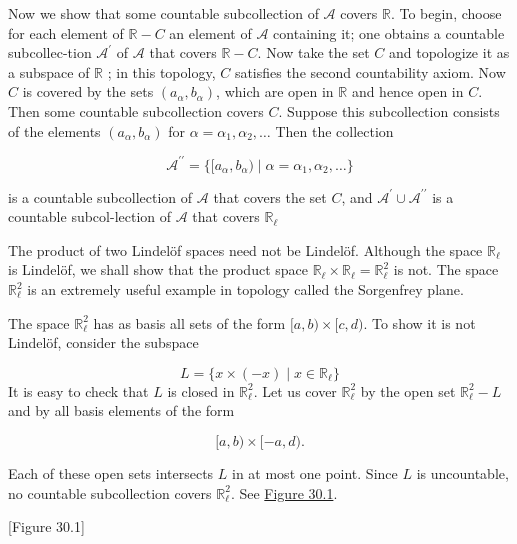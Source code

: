 \begin{centeredblock*}
\begin{example}
Now we show that some countable subcollection of \(\mathcal{A}\) covers \(\mathbb{R}\). To begin, choose for each element of \(\mathbb{R} - C\) an element of \(\mathcal{A}\) containing it; one obtains a countable subcollec-tion \(\mathcal{A}^{\prime }\) of \(\mathcal{A}\) that covers \(\mathbb{R} - C\). Now take the set \(C\) and topologize it as a subspace of \(\mathbb{R}\) ; in this topology, \(C\) satisfies the second countability axiom. Now \(C\) is covered by the sets \(( {a_{\alpha },b_{\alpha }})\), which are open in \(\mathbb{R}\) and hence open in \(C\). Then some countable subcollection covers \(C\). Suppose this subcollection consists of the elements \(( {a_{\alpha },b_{\alpha }})\) for \(\alpha = {\alpha }_{1},{\alpha }_{2},\ldots\) Then the collection

\[
\mathcal{A}^{\prime \prime } = \{ {[ {a_{\alpha },b_{\alpha }}) \mid \alpha = {\alpha }_{1},{\alpha }_{2},\ldots}\}
\]

is a countable subcollection of \(\mathcal{A}\) that covers the set \(C\), and \(\mathcal{A}^{\prime } \cup {\mathcal{A}}^{\prime \prime }\) is a countable subcol-lection of \(\mathcal{A}\) that covers \(\mathbb{R}_{\ell }\)
\end{example}
\end{centeredblock*}

\begin{centeredblock*}
\begin{example}
\label{ex:\thesection.\theexample}
 The product of two Lindelöf spaces need not be Lindelöf. Although the space \(\mathbb{R}_{\ell }\) is Lindelöf, we shall show that the product space \(\mathbb{R}_{\ell } \times {\mathbb{R}}_{\ell } = \mathbb{R}_{\ell }^{2}\) is not. The space \(\mathbb{R}_{\ell }^{2}\) is an extremely useful example in topology called the Sorgenfrey plane.

The space \(\mathbb{R}_{\ell }^{2}\) has as basis all sets of the form \(\lbrack a,b) \times \lbrack c,d)\). To show it is not Lindelöf, consider the subspace

\[
L = \{ {x \times ( {-x}) \mid x \in {\mathbb{R}}_{\ell }}\}
\]
It is easy to check that \(L\) is closed in \(\mathbb{R}_{\ell }^{2}\). Let us cover \(\mathbb{R}_{\ell }^{2}\) by the open set \(\mathbb{R}_{\ell }^{2} - L\) and by all basis elements of the form

\[
\lbrack a,b) \times \lbrack - a,d).
\]

Each of these open sets intersects \(L\) in at most one point. Since \(L\) is uncountable, no countable subcollection covers \(\mathbb{R}_{\ell }^{2}\). See \hyperref[fig:30.1]{Figure 30.1}.

[Figure 30.1]
\end{example}
\end{centeredblock*}

